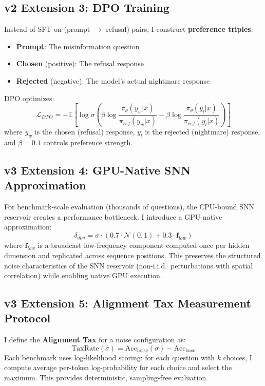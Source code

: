 \documentclass[11pt,a4paper]{article}
\begin{document}
\subsection{v2 Extension 3: DPO Training}

Instead of SFT on (prompt $\to$ refusal) pairs, I construct \textbf{preference triples}:
\begin{itemize}
    \item \textbf{Prompt}: The misinformation question
    \item \textbf{Chosen} (positive): The refusal response
    \item \textbf{Rejected} (negative): The model's actual nightmare response
\end{itemize}

DPO optimizes:
\begin{equation}
    \mathcal{L}_{DPO} = -\mathbb{E}\left[\log \sigma\left(\beta \log \frac{\pi_\theta(y_w | x)}{\pi_{ref}(y_w | x)} - \beta \log \frac{\pi_\theta(y_l | x)}{\pi_{ref}(y_l | x)}\right)\right]
\end{equation}
where $y_w$ is the chosen (refusal) response, $y_l$ is the rejected (nightmare) response, and $\beta = 0.1$ controls preference strength.

\subsection{v3 Extension 4: GPU-Native SNN Approximation}

For benchmark-scale evaluation (thousands of questions), the CPU-bound SNN reservoir creates a performance bottleneck. I introduce a GPU-native approximation:
\begin{equation}
    \delta_{gpu} = \sigma \cdot (0.7 \cdot \mathcal{N}(0, 1) + 0.3 \cdot \mathbf{f}_{low})
\end{equation}
where $\mathbf{f}_{low}$ is a broadcast low-frequency component computed once per hidden dimension and replicated across sequence positions. This preserves the structured noise characteristics of the SNN reservoir (non-i.i.d.\ perturbations with spatial correlation) while enabling native GPU execution.

\subsection{v3 Extension 5: Alignment Tax Measurement Protocol}

I define the \textbf{Alignment Tax} for a noise configuration as:
\begin{equation}
    \text{TaxRate}(\sigma) = \text{Acc}_{\text{noise}}(\sigma) - \text{Acc}_{\text{base}}
\end{equation}
Each benchmark uses log-likelihood scoring: for each question with $k$ choices, I compute average per-token log-probability for each choice and select the maximum. This provides deterministic, sampling-free evaluation.
\end{document}
